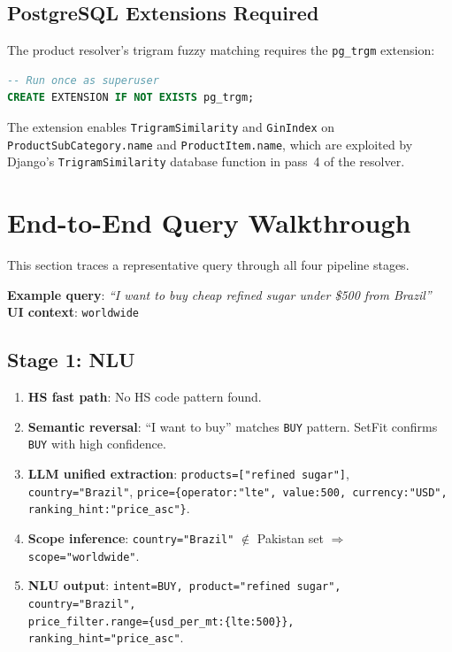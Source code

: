 \documentclass[12pt,a4paper]{article}
\begin{document}
\subsection{PostgreSQL Extensions Required}

The product resolver's trigram fuzzy matching requires the \texttt{pg\_trgm} extension:

\begin{lstlisting}[language=SQL, caption={pg\_trgm installation}]
-- Run once as superuser
CREATE EXTENSION IF NOT EXISTS pg_trgm;
\end{lstlisting}

The extension enables \texttt{TrigramSimilarity} and \texttt{GinIndex} on
\texttt{ProductSubCategory.name} and \texttt{ProductItem.name}, which are exploited
by Django's \texttt{TrigramSimilarity} database function in pass~4 of the resolver.

\newpage
\section{End-to-End Query Walkthrough}
\label{sec:walkthrough}

This section traces a representative query through all four pipeline stages.

\begin{infobox}
\textbf{Example query}: \emph{``I want to buy cheap refined sugar under \$500 from Brazil''}\\
\textbf{UI context}: \texttt{worldwide}
\end{infobox}

\subsection{Stage 1: NLU}

\begin{enumerate}
  \item \textbf{HS fast path}: No HS code pattern found.
  \item \textbf{Semantic reversal}: ``I want to buy'' matches \texttt{BUY} pattern.
        SetFit confirms \texttt{BUY} with high confidence.
  \item \textbf{LLM unified extraction}:
        \texttt{products=["refined sugar"]},
        \texttt{country="Brazil"},
        \texttt{price=\{operator:"lte", value:500, currency:"USD", ranking\_hint:"price\_asc"\}}.
  \item \textbf{Scope inference}: \texttt{country="Brazil"} $\notin$ Pakistan set
        $\Rightarrow$ \texttt{scope="worldwide"}.
  \item \textbf{NLU output}:
        \texttt{intent=BUY, product="refined sugar", country="Brazil",}\\
        \texttt{price\_filter.range=\{usd\_per\_mt:\{lte:500\}\}, ranking\_hint="price\_asc"}.
\end{enumerate}
\end{document}
